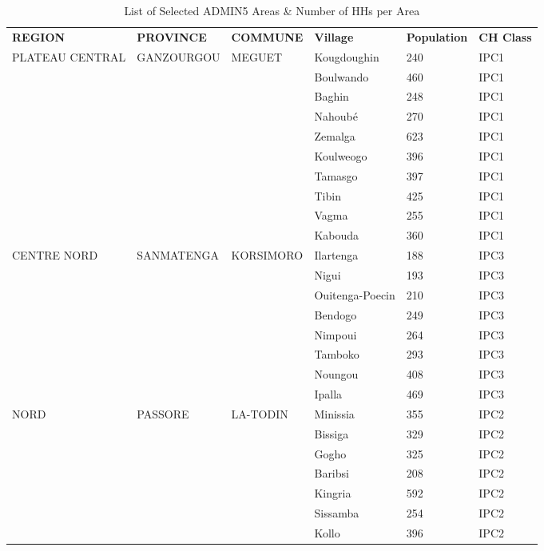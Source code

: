 \begin{table}[!ht]
	\caption{List of Selected ADMIN5 Areas \& Number of HHs per Area}
    \centering
    \begin{tabular}{llllll}
    \hline\hline
        \textbf{REGION} & \textbf{PROVINCE} & \textbf{COMMUNE} & \textbf{Village} & \textbf{Population} & \textbf{CH Class} \\ \cline{1-6}
        PLATEAU CENTRAL & GANZOURGOU & MEGUET & Kougdoughin & 240 & IPC1 \\ 
        ~ & ~ & ~ & Boulwando & 460 & IPC1 \\ 
        ~ & ~ & ~ & Baghin & 248 & IPC1 \\ 
        ~ & ~ & ~ & Nahoubé & 270 & IPC1 \\ 
        ~ & ~ & ~ & Zemalga & 623 & IPC1 \\ 
        ~ & ~ & ~ & Koulweogo & 396 & IPC1 \\ 
        ~ & ~ & ~ & Tamasgo & 397 & IPC1 \\ 
        ~ & ~ & ~ & Tibin & 425 & IPC1 \\ 
        ~ & ~ & ~ & Vagma & 255 & IPC1 \\ 
        ~ & ~ & ~ & Kabouda & 360 & IPC1 \\ 
        CENTRE NORD & SANMATENGA & KORSIMORO & Ilartenga & 188 & IPC3 \\ 
        ~ & ~ & ~ & Nigui & 193 & IPC3 \\ 
        ~ & ~ & ~ & Ouitenga-Poecin & 210 & IPC3 \\ 
        ~ & ~ & ~ & Bendogo & 249 & IPC3 \\ 
        ~ & ~ & ~ & Nimpoui & 264 & IPC3 \\ 
        ~ & ~ & ~ & Tamboko & 293 & IPC3 \\ 
        ~ & ~ & ~ & Noungou & 408 & IPC3 \\ 
        ~ & ~ & ~ & Ipalla & 469 & IPC3 \\ 
        NORD & PASSORE & LA-TODIN & Minissia & 355 & IPC2 \\ 
        ~ & ~ & ~ & Bissiga & 329 & IPC2 \\ 
        ~ & ~ & ~ & Gogho & 325 & IPC2 \\ 
        ~ & ~ & ~ & Baribsi & 208 & IPC2 \\ 
        ~ & ~ & ~ & Kingria & 592 & IPC2 \\ 
        ~ & ~ & ~ & Sissamba & 254 & IPC2 \\ 
        ~ & ~ & ~ & Kollo & 396 & IPC2 \\ 

\end{tabular}
\end{table}
